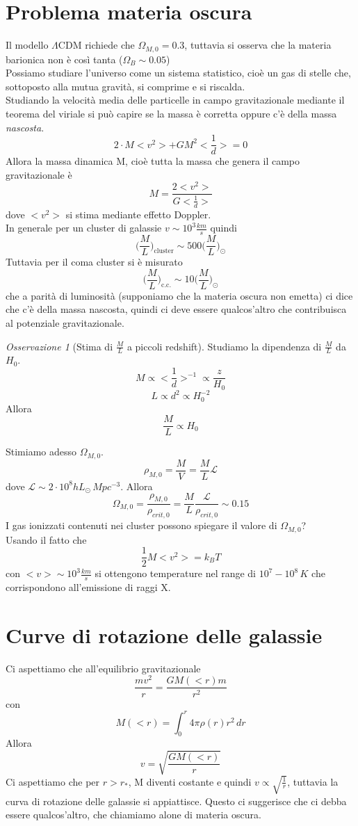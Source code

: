 \documentclass[10pt,a4paper]{article}
\let\oldmarginpar\marginpar
\renewcommand\marginpar[1]{\-\oldmarginpar[\raggedleft\footnotesize #1]%
	{\raggedright\footnotesize #1}}
\theoremstyle{break}
\theoremstyle{remark}
\newtheorem{oss}{Osservazione}
\theoremstyle{definition}
\begin{document}
\section{Problema materia oscura}
Il modello $\Lambda$CDM richiede che $\Omega_{M, 0} = 0.3$, tuttavia si osserva che la materia barionica non è così tanta ($\Omega_B \sim 0.05$) \\
Possiamo studiare l'universo come un sistema statistico, cioè un gas di stelle che, sottoposto alla mutua gravità, si comprime e si riscalda. \\
Studiando la velocità media delle particelle in campo gravitazionale mediante il teorema del viriale si può capire se la massa è corretta oppure c'è della massa \textit{nascosta}.
\[
2\cdot M <v^2> +  G M^2 <\frac1d> = 0
\]
Allora la massa dinamica M, cioè tutta la massa che genera il campo gravitazionale è
\[
M = \frac{2 <v^2>}{G <\frac1d>}
\]
dove $<v^2>$ si stima mediante effetto Doppler. \\
In generale per un cluster di galassie $v \sim 10^3 \frac{km}{s}$ quindi 
\[
\bigg(\frac{M}{L}\bigg)_{\text{cluster}} \sim 500\bigg(\frac{M}{L}\bigg)_\odot
\]
Tuttavia per il coma cluster si è misurato 
\[
\bigg(\frac{M}{L}\bigg)_{\text{c.c.}} \sim 10\bigg(\frac{M}{L}\bigg)_\odot
\]
che a parità di luminosità (supponiamo che la materia oscura non emetta) ci dice che c'è della massa nascosta, quindi ci deve essere qualcos'altro che contribuisca al potenziale gravitazionale.
\begin{oss}[Stima di $\frac{M}{L}$ a piccoli redshift]
	Studiamo la dipendenza di $\frac{M}{L}$ da $H_0$.\\
	\[
	M \propto <\frac1d>^{-1} \propto \frac{z}{H_0}
	\]
	\marginpar{Dalla legge di Hubble $H_0 d = z$}
	\[
	L \propto d^2 \propto H_0^{-2}
	\]
	Allora
	\[
	\frac{M}{L} \propto H_0
	\]
\end{oss}

Stimiamo adesso $\Omega_{M, 0}$.
\[
\rho_{M, 0} = \frac{M}{V} = \frac{M}{L} \mathcal{L}
\]
dove $\mathcal{L} \sim 2\cdot 10^8 h L_\odot\, Mpc^{-3}$. Allora
\[
\Omega_{M, 0} = \frac{\rho_{M, 0}}{\rho_{crit, 0}} = \frac{M}{L} \frac{\mathcal{L}}{\rho_{crit, 0}} \sim 0.15
\]
I gas ionizzati contenuti nei cluster possono spiegare il valore di $\Omega_{M, 0}$?\\
Usando il fatto che 
\[
\frac12 M <v^2> = k_B T
\]
con $<v> \sim 10^3 \frac{km}{s}$ si ottengono temperature nel range di $10^7 - 10^8 \, K$ che corrispondono all'emissione di raggi X.
\section{Curve di rotazione delle galassie}
Ci aspettiamo che all'equilibrio gravitazionale 
\[
\frac{m v^2}{r} = \frac{G M(<r)m}{r^2}
\]
con 
\[
M(<r) = \int_{0}^{r} 4 \pi \rho(r) r^2 \, dr
\]
Allora 
\[
v = \sqrt{\frac{G M(<r)}{r}}
\]
Ci aspettiamo che per $r > r_*$, M diventi costante e quindi $v \propto \sqrt{\frac1r}$, tuttavia la curva di rotazione delle galassie si appiattisce. Questo ci suggerisce che ci debba essere qualcos'altro, che chiamiamo alone di materia oscura.
\end{document}
